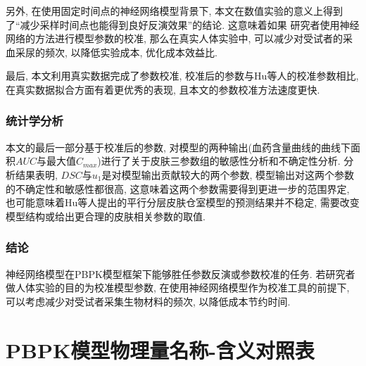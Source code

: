 \documentclass[a4paper,punct=banjiao,twoside]{ctexrep}
\theoremstyle{plain}
\theoremstyle{definition}
\theoremstyle{remark}
\begin{document}
另外, 在使用固定时间点的神经网络模型背景下, 本文在数值实验的意义上得到了``减少采样时间点也能得到良好反演效果''的结论. 这意味着如果
研究者使用神经网络的方法进行模型参数的校准, 那么在真实人体实验中, 可以减少对受试者的采血采尿的频次, 以降低实验成本, 优化成本效益比.

最后, 本文利用真实数据完成了参数校准, 校准后的参数与Hu等人\cite{11}的校准参数相比, 在真实数据拟合方面有着更优秀的表现, 且本文的参数校准方法速度更快.

\subsection*{统计学分析}
本文的最后一部分基于校准后的参数, 对模型的两种输出(血药含量曲线的曲线下面积$AUC$与最大值$C_{max}$)进行了关于皮肤三参数组的敏感性分析和不确定性分析. 分析结果表明, $DSC$与$u_1$是对模型输出贡献较大的两个参数, 模型输出对这两个参数的不确定性和敏感性都很高, 
这意味着这两个参数需要得到更进一步的范围界定, 也可能意味着Hu等人\cite{11}提出的平行分层皮肤仓室模型的预测结果并不稳定, 需要改变模型结构或给出更合理的皮肤相关参数的取值.

\subsection*{结论}
神经网络模型在PBPK模型框架下能够胜任参数反演或参数校准的任务. 若研究者做人体实验的目的为校准模型参数, 在使用神经网络模型作为校准工具的前提下, 可以考虑减少对受试者采集生物材料的频次, 以降低成本节约时间.

\appendix

\chapter{PBPK模型物理量名称-含义对照表}
\end{document}
